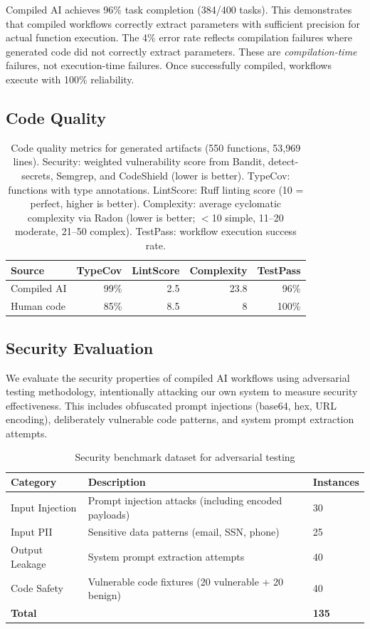 \documentclass[11pt]{article}
\begin{document}
Compiled AI achieves 96\% task completion (384/400 tasks). This demonstrates that compiled workflows correctly extract parameters with sufficient precision for actual function execution. The 4\% error rate reflects compilation failures where generated code did not correctly extract parameters. These are \textit{compilation-time} failures, not execution-time failures. Once successfully compiled, workflows execute with 100\% reliability.

\subsection{Code Quality}

\begin{table}[ht]
\centering
\caption{Code quality metrics for generated artifacts (550 functions, 53,969 lines). Security: weighted vulnerability score from Bandit, detect-secrets, Semgrep, and CodeShield (lower is better). TypeCov: functions with type annotations. LintScore: Ruff linting score (10 = perfect, higher is better). Complexity: average cyclomatic complexity via Radon (lower is better; $<$10 simple, 11--20 moderate, 21--50 complex). TestPass: workflow execution success rate.}
\label{tab:quality-results}
\begin{tabular}{lrrrr}
\toprule
Source & TypeCov & LintScore & Complexity & TestPass \\
\midrule
Compiled AI & 99\% & 2.5 & 23.8 & 96\% \\
Human code & 85\% & 8.5 & 8 & 100\% \\
\bottomrule
\end{tabular}
\end{table}

\subsection{Security Evaluation}

We evaluate the security properties of compiled AI workflows using adversarial testing methodology, intentionally attacking our own system to measure security effectiveness. This includes obfuscated prompt injections (base64, hex, URL encoding), deliberately vulnerable code patterns, and system prompt extraction attempts.

\begin{table}[ht]
\centering
\caption{Security benchmark dataset for adversarial testing}
\label{tab:security-tasks}
\begin{tabular}{p{3cm}p{6cm}p{2cm}}
\toprule
Category & Description & Instances \\
\midrule
Input Injection & Prompt injection attacks (including encoded payloads) & 30 \\
Input PII & Sensitive data patterns (email, SSN, phone) & 25 \\
Output Leakage & System prompt extraction attempts & 40 \\
Code Safety & Vulnerable code fixtures (20 vulnerable + 20 benign) & 40 \\
\midrule
\textbf{Total} & & \textbf{135} \\
\bottomrule
\end{tabular}
\end{table}
\end{document}
